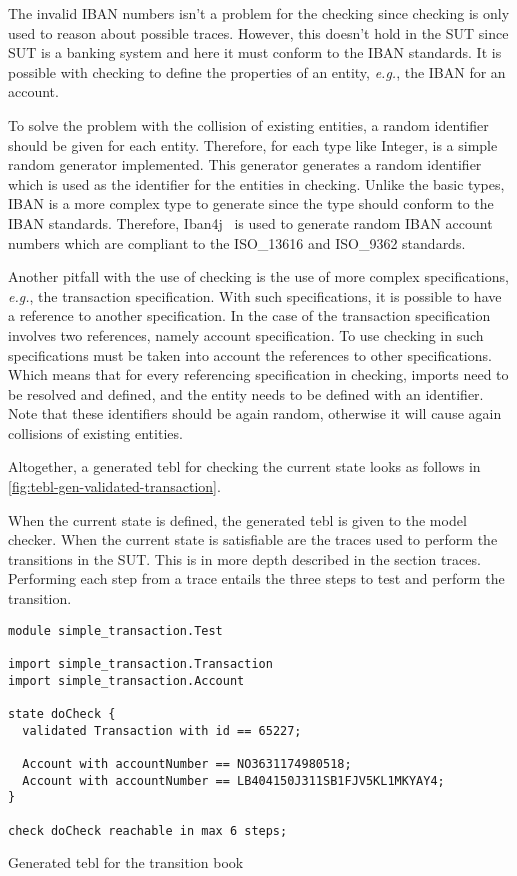 The invalid IBAN numbers isn't a problem for the
checking since checking is only used to reason about possible traces. However,
this doesn't hold in the SUT since SUT is a banking system and here it must
conform to the IBAN standards. It is possible with checking to define the
properties of an entity, \textit{e.g.}, the IBAN for an account.

To solve the
problem with the collision of existing entities, a random identifier should be
given for each entity. Therefore, for each type like Integer, is a simple random
generator implemented. This generator generates a random identifier which is
used as the identifier for the entities in checking. Unlike the basic types,
IBAN is a more complex type to generate since the type should conform to the
IBAN standards. Therefore, Iban4j~\cite{iban4j} is used to generate random IBAN
account numbers which are compliant to the ISO\_13616 and ISO\_9362 standards.

Another pitfall with the use of checking is the use of more complex
specifications, \textit{e.g.}, the transaction specification. With such
specifications, it is possible to have a reference to another specification. In
the case of the transaction specification involves two references, namely
account specification. To use checking in such specifications must be taken into
account the references to other specifications. Which means that for every
referencing specification in checking, imports need to be resolved and defined,
and the entity needs to be defined with an identifier. Note that these
identifiers should be again random, otherwise it will cause again collisions of
existing entities.

Altogether, a generated tebl for checking the current state looks as follows in
\autoref{fig:tebl-gen-validated-transaction}.

When the current state is defined, the generated tebl is given to the model
checker. When the current state is satisfiable are the traces used to perform
the transitions in the SUT. This is in more depth described in the section
traces. Performing each step from a trace entails the three steps to test and
perform the transition.

\begin{sourcecode}[h!]
\begin{lstlisting}[]
module simple_transaction.Test

import simple_transaction.Transaction
import simple_transaction.Account

state doCheck {
  validated Transaction with id == 65227;

  Account with accountNumber == NO3631174980518;
  Account with accountNumber == LB404150J311SB1FJV5KL1MKYAY4;
}

check doCheck reachable in max 6 steps;
\end{lstlisting}
\caption{Generated tebl for the transition book}
\label{fig:tebl-gen-validated-transaction}
\end{sourcecode}

